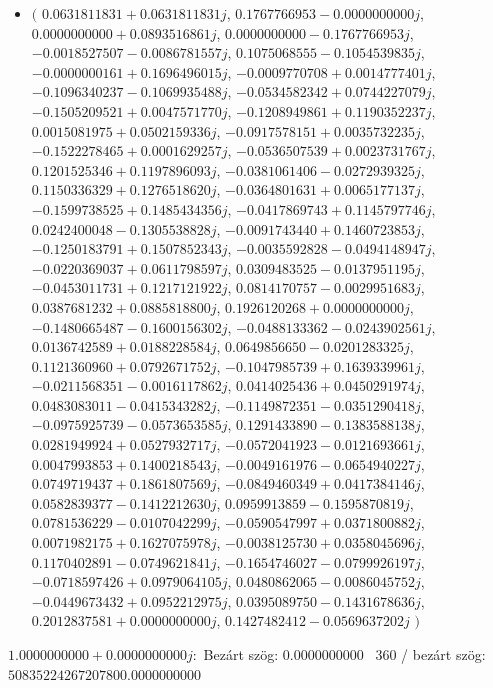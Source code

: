 \documentclass[14pt,a4paper]{article}
\begin{document}
\begin{itemize}
\item
$\big($
$0.0631811831+0.0631811831j$, $0.1767766953-0.0000000000j$, $0.0000000000+0.0893516861j$, $0.0000000000-0.1767766953j$, $-0.0018527507-0.0086781557j$, $0.1075068555-0.1054539835j$, $-0.0000000161+0.1696496015j$, $-0.0009770708+0.0014777401j$, $-0.1096340237-0.1069935488j$, $-0.0534582342+0.0744227079j$, $-0.1505209521+0.0047571770j$, $-0.1208949861+0.1190352237j$, $0.0015081975+0.0502159336j$, $-0.0917578151+0.0035732235j$, $-0.1522278465+0.0001629257j$, $-0.0536507539+0.0023731767j$, $0.1201525346+0.1197896093j$, $-0.0381061406-0.0272939325j$, $0.1150336329+0.1276518620j$, $-0.0364801631+0.0065177137j$, $-0.1599738525+0.1485434356j$, $-0.0417869743+0.1145797746j$, $0.0242400048-0.1305538828j$, $-0.0091743440+0.1460723853j$, $-0.1250183791+0.1507852343j$, $-0.0035592828-0.0494148947j$, $-0.0220369037+0.0611798597j$, $0.0309483525-0.0137951195j$, $-0.0453011731+0.1217121922j$, $0.0814170757-0.0029951683j$, $0.0387681232+0.0885818800j$, $0.1926120268+0.0000000000j$, $-0.1480665487-0.1600156302j$, $-0.0488133362-0.0243902561j$, $0.0136742589+0.0188228584j$, $0.0649856650-0.0201283325j$, $0.1121360960+0.0792671752j$, $-0.1047985739+0.1639339961j$, $-0.0211568351-0.0016117862j$, $0.0414025436+0.0450291974j$, $0.0483083011-0.0415343282j$, $-0.1149872351-0.0351290418j$, $-0.0975925739-0.0573653585j$, $0.1291433890-0.1383588138j$, $0.0281949924+0.0527932717j$, $-0.0572041923-0.0121693661j$, $0.0047993853+0.1400218543j$, $-0.0049161976-0.0654940227j$, $0.0749719437+0.1861807569j$, $-0.0849460349+0.0417384146j$, $0.0582839377-0.1412212630j$, $0.0959913859-0.1595870819j$, $0.0781536229-0.0107042299j$, $-0.0590547997+0.0371800882j$, $0.0071982175+0.1627075978j$, $-0.0038125730+0.0358045696j$, $0.1170402891-0.0749621841j$, $-0.1654746027-0.0799926197j$, $-0.0718597426+0.0979064105j$, $0.0480862065-0.0086045752j$, $-0.0449673432+0.0952212975j$, $0.0395089750-0.1431678636j$, $0.2012837581+0.0000000000j$, $0.1427482412-0.0569637202j$
$\big)$
\end{itemize}
$1.0000000000+0.0000000000j$:\
Bezárt szög: $0.0000000000$ \
360 / bezárt szög: $50835224267207800.0000000000$\
\end{document}
